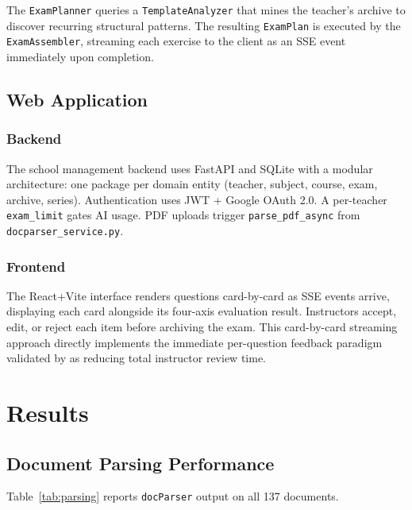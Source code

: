 \documentclass[12pt, a4paper]{article}
\begin{document}
The \texttt{ExamPlanner} queries a \texttt{TemplateAnalyzer} that mines the teacher's
archive to discover recurring structural patterns. The resulting \texttt{ExamPlan} is
executed by the \texttt{ExamAssembler}, streaming each exercise to the client as an
SSE event immediately upon completion.

\subsection{Web Application}
\label{subsec:webapp}

\subsubsection{Backend}

The school management backend uses FastAPI \cite{fastapi2019} and SQLite with a
modular architecture: one package per domain entity (teacher, subject, course, exam,
archive, series). Authentication uses JWT + Google OAuth 2.0. A per-teacher
\texttt{exam\_limit} gates AI usage. PDF uploads trigger \texttt{parse\_pdf\_async}
from \texttt{docparser\_service.py}.

\subsubsection{Frontend}

The React+Vite interface renders questions card-by-card as SSE events arrive,
displaying each card alongside its four-axis evaluation result. Instructors accept,
edit, or reject each item before archiving the exam. This card-by-card streaming
approach directly implements the immediate per-question feedback paradigm validated
by \citet{mucciaccia2025mcq} as reducing total instructor review time.

\section{Results}
\label{sec:results}

\subsection{Document Parsing Performance}

Table~\ref{tab:parsing} reports \texttt{docParser} output on all 137 documents.
\end{document}
